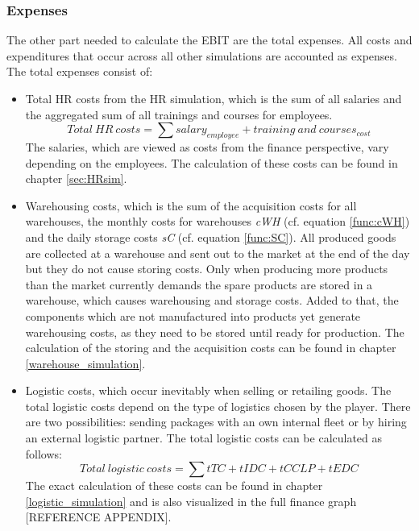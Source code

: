 \subsubsection{Expenses}
The other part needed to calculate the EBIT are the total expenses. All costs and expenditures that occur across all other simulations are accounted as expenses. The total expenses consist of:
\begin{itemize}
    \item Total HR costs from the HR simulation, which is the sum of all salaries and the aggregated sum of all trainings and courses for employees. 
    \begin{equation}
        Total~HR~costs = \sum salary_{employee} + training \ and \ courses_{cost}
    \end{equation}
    The salaries, which are viewed as costs from the finance perspective, vary depending on the employees. The calculation of these costs can be found in chapter  \ref{sec:HRsim}.
    \item Warehousing costs, which is the sum of the acquisition costs %
    for all warehouses, the monthly costs for warehouses \textit{cWH} (cf. equation \ref{func:cWH}) and the daily storage costs \textit{sC} (cf. equation \ref{func:SC}). All produced goods are collected at a warehouse and sent out to the market at the end of the day but they do not cause storing costs. Only when producing more products than the market currently demands the spare products are stored in a warehouse, which causes warehousing and storage costs. Added to that, the components which are not manufactured into products yet generate warehousing costs, as they need to be stored until ready for production. The calculation of the storing and the acquisition costs can be found in chapter \ref{warehouse_simulation}. 
    \item Logistic costs, which occur inevitably when selling or retailing goods. The total logistic costs depend on the type of logistics chosen by the player. There are two possibilities: sending packages with an own internal fleet or by hiring an external logistic partner. The total logistic costs can be calculated as follows:
    \begin{equation}
        Total \ logistic \ costs = \sum tTC + tIDC + tCCLP + tEDC
    \end{equation}
    The exact calculation of these costs can be found in chapter \ref{logistic_simulation} and is also visualized in the full finance graph [REFERENCE APPENDIX].

\end{itemize}
